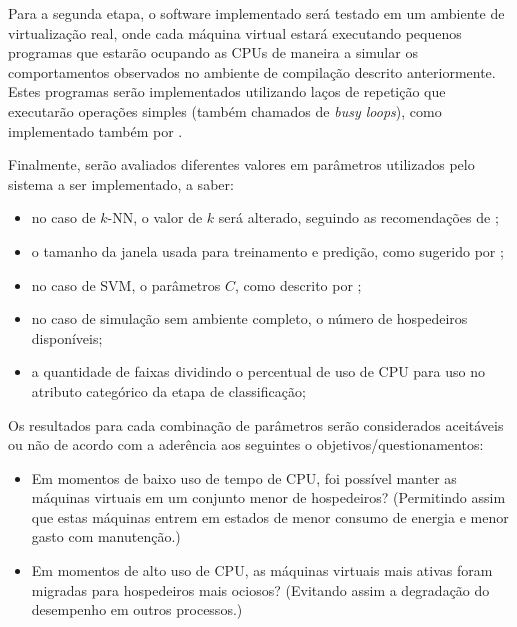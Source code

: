 Para a segunda etapa, o software implementado será testado em um ambiente de
virtualização real, onde cada máquina virtual estará executando pequenos
programas que estarão ocupando as CPUs de maneira a simular os comportamentos
observados no ambiente de compilação descrito anteriormente.  Estes programas
serão implementados utilizando laços de repetição que executarão operações
simples (também chamados de \emph{busy loops}), como implementado também por
.

Finalmente, serão avaliados diferentes valores em parâmetros utilizados
pelo sistema a ser implementado, a saber:

\begin{itemize}
  \item no caso de $k$-NN, o valor de $k$ será alterado, seguindo as
        recomendações de ;
   \item o tamanho da janela usada para treinamento e predição, como sugerido
        por ;
   \item no caso de SVM, o parâmetros $C$, como descrito por ;
   \item no caso de simulação sem ambiente completo, o número de hospedeiros disponíveis;
   \item a quantidade de faixas dividindo o percentual de uso de CPU para
         uso no atributo categórico da etapa de classificação;
\end{itemize}


Os resultados para cada combinação de parâmetros serão considerados
aceitáveis ou não de acordo com a aderência aos seguintes o
objetivos/questionamentos:
\begin{itemize}
  \item Em momentos de baixo uso de tempo de CPU, foi possível manter as
        máquinas virtuais em um conjunto menor de hospedeiros? (Permitindo
        assim que estas máquinas entrem em estados de menor consumo de
        energia e menor gasto com manutenção.)
  \item Em momentos de alto uso de CPU, as máquinas virtuais mais ativas
        foram migradas para hospedeiros mais ociosos? (Evitando assim a
        degradação do desempenho em outros processos.)
\end{itemize}

